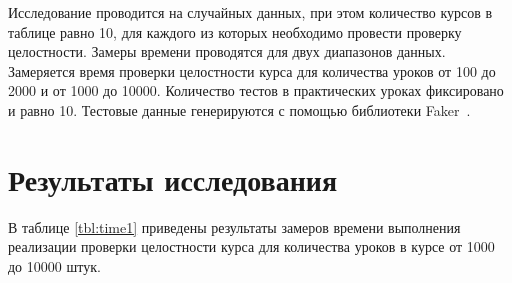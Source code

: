 Исследование проводится на случайных данных, при этом количество курсов в таблице равно 10, для каждого из которых необходимо провести проверку целостности. Замеры времени проводятся для двух диапазонов данных. Замеряется время проверки целостности курса для количества уроков от 100 до 2000 и от 1000 до 10000. Количество тестов в практических уроках фиксировано и равно 10. Тестовые данные генерируются с помощью библиотеки Faker~\cite{faker}.

\section{Результаты исследования}

В таблице \ref{tbl:time1} приведены результаты замеров времени выполнения реализации проверки целостности курса для количества уроков в курсе от 1000 до 10000 штук.

\begin{table}[H]
    \caption{\label{tbl:time1}Результат замеров времени проверки целостности для количества записей от 1000 до 10000 с шагом 1000.}
\end{table}

